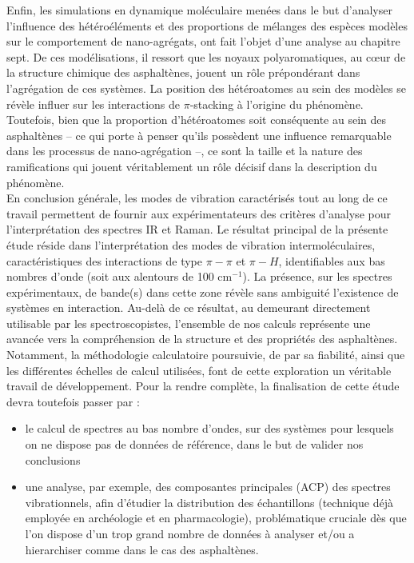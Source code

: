  
 
 	Enfin, les simulations en dynamique moléculaire menées dans le but d'analyser l'influence des hétéroéléments et des proportions de mélanges des espèces modèles sur le comportement de nano-agrégats, ont fait l'objet d'une analyse au chapitre sept. De ces modélisations, il ressort que les noyaux polyaromatiques, au cœur de la structure chimique des asphaltènes, jouent un rôle prépondérant dans l'agrégation de ces systèmes. La position des hétéroatomes au sein des modèles se révèle influer sur les interactions de $\pi$-stacking à l'origine du phénomène. Toutefois, bien que la proportion d'hétéroatomes soit conséquente au sein des asphaltènes -- ce qui porte à penser qu'ils possèdent une influence remarquable dans les processus de nano-agrégation --, ce sont la taille et la nature des ramifications qui jouent véritablement un rôle décisif dans la description du phénomène. \\
	
	
	En conclusion générale, les modes de vibration caractérisés tout au long de ce travail permettent de fournir aux expérimentateurs des critères d'analyse pour l'interprétation des spectres IR et Raman. 
	Le résultat principal de la présente étude réside dans l'interprétation des modes de vibration intermoléculaires, caractéristiques des interactions de type $\pi-\pi$ et $\pi-H$, identifiables aux bas nombres d'onde (soit aux alentours de 100 cm$^{-1}$). La présence, sur les spectres expérimentaux, de bande(s) dans cette zone révèle sans ambiguité l'existence de systèmes en interaction. Au-delà de ce résultat, au demeurant directement utilisable par les spectroscopistes, l'ensemble de nos calculs représente une avancée vers la compréhension de la structure et des propriétés des asphaltènes. Notamment, la méthodologie calculatoire poursuivie, de par sa fiabilité, ainsi que les différentes échelles de calcul utilisées, font de cette exploration un véritable travail de développement. Pour la rendre complète, la finalisation de cette étude devra toutefois passer par :
	
	\begin{itemize}
	\item le calcul de spectres au bas nombre d'ondes, sur des systèmes pour lesquels on ne dispose pas de données de référence, dans le but de valider nos conclusions
	\item une analyse, par exemple, des composantes principales (ACP) des spectres vibrationnels, afin d'étudier la distribution des échantillons (technique déjà employée en archéologie et en pharmacologie), problématique cruciale dès que l'on dispose d'un trop grand nombre de données à analyser et/ou a hierarchiser comme dans le cas des asphaltènes. 
	\end{itemize}













 	
	
	
	
	
	

	
	
	